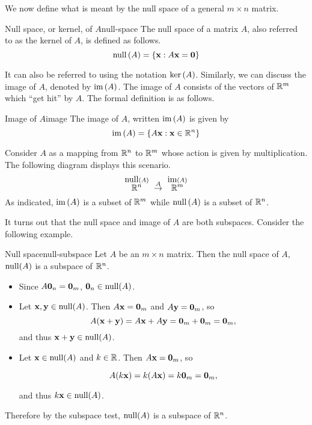 We now define what is meant by the null space of a general $m\times n$ matrix.

\begin{definition}{Null space, or kernel, of $A$}{null-space}
The null space of a matrix $A$, also referred to as the kernel of $A$, 
is defined as follows.%
\begin{equation*}
\mbox{\rm null} \left(A\right) =\left\{\mbox{\bf x} :A \mbox{\bf x} =\mbox{\bf 0}\right\}
\end{equation*}
\end{definition}

It can also be referred to using the notation $\ker \left(
A\right) $. 
Similarly, we can discuss the image of $A$, denoted by
$\mbox{\rm im}\left(A\right)$. The image of $A$ consists of the vectors
of $\mathbb{R}^{m}$ which ``get hit'' by $A$.  The formal definition
is as follows.

\begin{definition}{Image of $A$}{image}
The image of $A$, written $\mbox{\rm im}\left(A\right)$ is given by
\[
\mbox{\rm im}\left(A \right) = \left\{A\mbox{\bf x} : \mbox{\bf x} \in \mathbb{R}^n \right\}
\]
\end{definition}

Consider
$A$ as a mapping from $\mathbb{R}^{n}$ to $\mathbb{R}^{m}$ whose action is given by multiplication. The following diagram displays this scenario. 
\begin{equation*}
\overset{\func{null} \tup{A} }{\R^{n}}\ \overset{A}{\rightarrow }\ 
\overset{
\func{im}\tup{A} }{\R^{m}}
\end{equation*}
As indicated, $\mbox{\rm im}\left(A\right) $ is a subset of $\mathbb{R}^{m}$
while $\mbox{\rm null} \left(A\right) $ is a subset of $\mathbb{R}^{n}$.

It turns out that the null space and image of $A$ are both subspaces. Consider the following example.

\begin{example}{Null space}{null-subspace}
Let $A$ be an $m\times n$ matrix. Then the null space of $A$, $\mbox{\rm null}(A)$ is 
a subspace of $\mathbb{R}^n$.
\end{example}

\begin{solution}
\begin{itemize}
\item Since $A\mbox{\bf 0}_n=\mbox{\bf 0}_m$, 
$\mbox{\bf 0}_n\in\mbox{\rm null}(A)$.

\item Let $\mbox{\bf x},\mbox{\bf y}\in\mbox{\rm null}(A)$. 
Then $A\mbox{\bf x}=\mbox{\bf 0}_m$ and $A\mbox{\bf y}=\mbox{\bf 0}_m$, so
\[ A(\mbox{\bf x}+\mbox{\bf y})=A\mbox{\bf x}+A\mbox{\bf y} = \mbox{\bf 0}_m+\mbox{\bf 0}_m=\mbox{\bf 0}_m,\]
and thus $\mbox{\bf x}+\mbox{\bf y}\in\mbox{\rm null}(A)$.
\item Let $\mbox{\bf x}\in\mbox{\rm null}(A)$ and $k\in\mathbb{R}$.
Then $A\mbox{\bf x}=\mbox{\bf 0}_m$, so

\[ A(k\mbox{\bf x}) = k(A\mbox{\bf x})=k\mbox{\bf 0}_m=\mbox{\bf 0}_m,\]

and thus $k\mbox{\bf x}\in\mbox{\rm null}(A)$.
\end{itemize}
Therefore by the subspace test, $\mbox{\rm null}(A)$ is a subspace of $\mathbb{R}^n$.

\end{solution}

